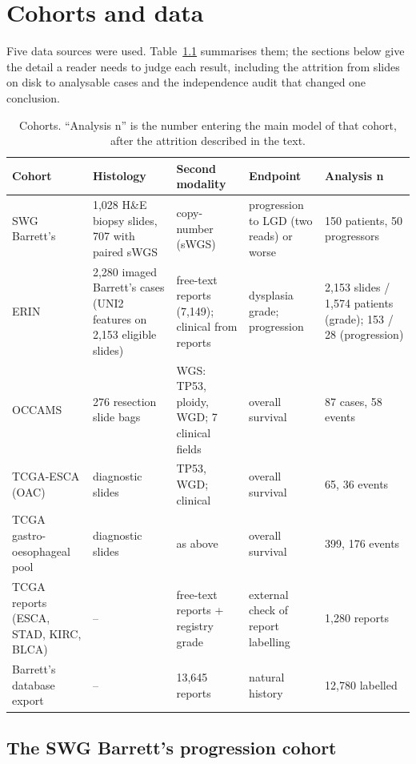\chapter{Cohorts and data}
\label{ch:cohorts}

Five data sources were used. Table~\ref{tab:cohorts} summarises them; the sections below give the detail a reader needs to judge each result, including the attrition from slides on disk to analysable cases and the independence audit that changed one conclusion.

\begin{table}[htbp]
\centering\small
\caption{Cohorts. ``Analysis n'' is the number entering the main model of that cohort, after the attrition described in the text.}
\label{tab:cohorts}
\begin{tabular}{@{}p{2.6cm}p{3.1cm}p{2.9cm}p{2.8cm}p{2.6cm}@{}}
\toprule
Cohort & Histology & Second modality & Endpoint & Analysis n \\
\midrule
SWG Barrett's & 1,028 H\&E biopsy slides, 707 with paired sWGS & copy-number (sWGS) & progression to LGD (two reads) or worse & 150 patients, 50 progressors \\
ERIN & 2,280 imaged Barrett's cases (UNI2 features on 2,153 eligible slides) & free-text reports (7,149); clinical from reports & dysplasia grade; progression & 2,153 slides / 1,574 patients (grade); 153 / 28 (progression) \\
OCCAMS & 276 resection slide bags & WGS: TP53, ploidy, WGD; 7 clinical fields & overall survival & 87 cases, 58 events \\
TCGA-ESCA (OAC) & diagnostic slides & TP53, WGD; clinical & overall survival & 65, 36 events \\
TCGA gastro-oesophageal pool & diagnostic slides & as above & overall survival & 399, 176 events \\
TCGA reports (ESCA, STAD, KIRC, BLCA) & -- & free-text reports + registry grade & external check of report labelling & 1,280 reports \\
Barrett's database export & -- & 13,645 reports & natural history & 12,780 labelled \\
\bottomrule
\end{tabular}
\end{table}

\section{The SWG Barrett's progression cohort}
\label{sec:swg}

